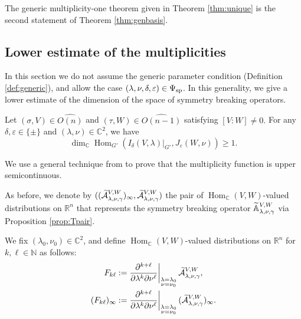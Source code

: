 The generic multiplicity-one theorem 
 given in Theorem \ref{thm:unique} is the second statement
 of Theorem \ref{thm:genbasis}.  



\subsection{Lower estimate of the multiplicities}
\label{subsec:existSBO}

In this section
 we do not assume the generic parameter condition
 (Definition \ref{def:generic}), 
 and allow the case $(\lambda, \nu, \delta,\varepsilon) \in \Psi_{{\operatorname{sp}}}$.  
In this generality, 
 we give a lower estimate 
 of the dimension of the space of symmetry breaking operators.  
\begin{theorem}
\label{thm:existSBO}
Let $(\sigma, V) \in \widehat {O(n)}$
 and $(\tau,W) \in \widehat {O(n-1)}$
 satisfying 
$
[V:W]\ne 0.  
$
For any $\delta, \varepsilon \in \{ \pm \}$ 
 and $(\lambda, \nu)\in {\mathbb{C}}^2$, 
 we have
\[
   \dim_{\mathbb{C}}
   {\operatorname{Hom}}_{G'}(I_{\delta}(V,\lambda)|_{G'},J_{\varepsilon}(W,\nu))\ge 1.  
\]
\end{theorem}



We use a general technique from \cite[Lem.~11.10]{sbon}
 to prove that the multiplicity function
 is upper semicontinuous.  



As before, 
 we denote by 
$
   ((\widetilde{{\mathcal{A}}}_{{\lambda},{\nu},{\gamma}}^{{V,W}})_{\infty}, 
    \widetilde{{\mathcal{A}}}_{{\lambda},{\nu},{\gamma}}^{{V,W}})
$ 
 the pair of ${\operatorname{Hom}}_{\mathbb{C}}(V,W)$-valued distributions
 on ${\mathbb{R}}^n$
that represents the symmetry breaking operator ${\widetilde{\mathbb{A}}}_{{\lambda},{\nu},{\gamma}}^{{V,W}}$
 via Proposition \ref{prop:Tpair}.  



We fix $(\lambda_0, \nu_0)\in {\mathbb{C}}^2$,
 and define ${\operatorname{Hom}}_{\mathbb{C}}(V,W)$-valued
 distributions on ${\mathbb{R}}^n$
 for $k, \ell \in {\mathbb{N}}$ as follows:
\begin{align*}
F_{k \ell}:=& \left.\frac{\partial^{k+\ell}}{\partial \lambda^k \partial \nu^\ell}\right|_{\substack{\lambda=\lambda_0 \\ \nu=\nu_0}}
          \widetilde{{\mathcal{A}}}_{{\lambda},{\nu},{\gamma}}^{{V,W}}, 
\\
(F_{k \ell})_{\infty}:=& \left.\frac{\partial^{k+\ell}}{\partial \lambda^k \partial \nu^\ell}\right|_{\substack{\lambda=\lambda_0 \\ \nu=\nu_0}}
          (\widetilde{{\mathcal{A}}}_{{\lambda},{\nu},{\gamma}}^{{V,W}})_{\infty}.   
\end{align*}

